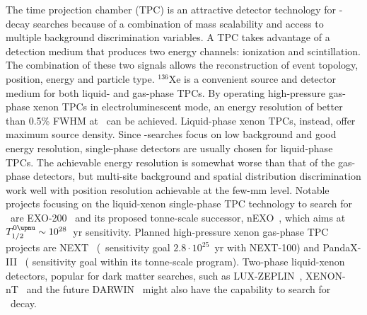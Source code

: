 \begin{description}[wide]
  \item[Time Projection Chambers] The time projection chamber (TPC) is an
    attractive detector technology for \onbb-decay searches because of a
    combination of mass scalability and access to multiple background
    discrimination variables. A TPC takes advantage of a detection medium that
    produces two energy channels: ionization and scintillation. The combination
    of these two signals allows the reconstruction of event topology, position,
    energy and particle type. $^{136}$Xe is a convenient source and detector
    medium for both liquid- and gas-phase TPCs. By operating high-pressure
    gas-phase xenon TPCs in electroluminescent mode, an energy resolution of
    better than 0.5\% FWHM at \qbb\ can be achieved. Liquid-phase xenon TPCs,
    instead, offer maximum source density. Since \onbb-searches focus on low
    background and good energy resolution, single-phase detectors are usually
    chosen for liquid-phase TPCs. The achievable energy resolution is somewhat
    worse than that of the gas-phase detectors, but multi-site background and
    spatial distribution discrimination work well with position resolution
    achievable at the few-mm level. Notable projects focusing on the
    liquid-xenon single-phase TPC technology to search for \onbb\ are
    EXO-200~\cite{Auger2012} and its proposed tonne-scale successor,
    nEXO~\cite{Kharusi2018}, which aims at $\thalfzeroM \sim 10^{28}$~yr
    sensitivity.  Planned high-pressure xenon gas-phase TPC projects are
    NEXT~\cite{Lopez-March2017} (\thalfzero\ sensitivity goal $2.8 \cdot
    10^{25}$~yr with NEXT-100) and PandaX-III~\cite{Chen2016} (
    sensitivity goal within its tonne-scale program). Two-phase liquid-xenon
    detectors, popular for dark matter searches, such as
    LUX-ZEPLIN~\cite{Akerib2015}, XENON-nT~\cite{Aprile2017} and the future
    DARWIN~\cite{Aalbers2016} might also have the capability to search for
    \onbb\ decay.


\end{description}
